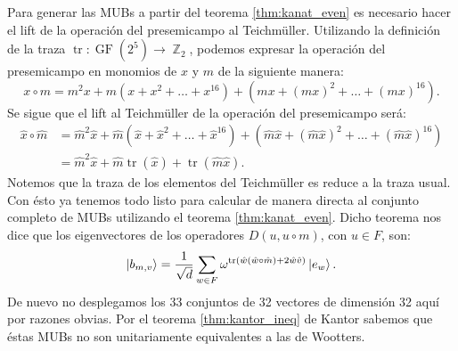 \documentclass[a4paper,11pt]{report}
\DeclareMathOperator{\Z}{\mathbb{Z}}
\DeclareMathOperator{\tr}{tr}
\DeclareMathOperator{\GF}{GF}
\begin{document}
  Para generar las MUBs a partir del teorema
  \ref{thm:kanat_even} es necesario hacer el lift de la
  operación del presemicampo al Teichmüller. Utilizando la
  definición de la traza $\tr : \GF(2^{5}) \to \Z_2$,
  podemos expresar la operación del presemicampo en monomios
  de $x$ y $m$ de la siguiente manera:
  \begin{equation}
    x \circ m
    = m^2 x + m \left( x + x^2 + \ldots + x^{16} \right) +
    \left( mx + (mx)^2 + \ldots + (mx)^{16} \right).
  \end{equation}
  Se sigue que el lift al Teichmüller de la operación del
  presemicampo será: 
  \begin{align}
    \hat x \circ \hat m
    &= \hat m^2 \hat x + \hat m \left( \hat x + \hat x^2 +
    \ldots + \hat x^{16} \right) +
    \left( \hat m \hat x + (\hat m \hat x)^2 + \ldots +
    (\hat m \hat x)^{16} \right) \\
    &= \hat m^2 \hat x + \hat m \tr(\hat x) + \tr(\hat m
    \hat x).
  \end{align}
  Notemos que la traza de los elementos del Teichmüller es
  reduce a la traza usual. Con ésto ya tenemos todo listo
  para calcular de manera directa al conjunto completo de
  MUBs utilizando el teorema \ref{thm:kanat_even}. Dicho
  teorema nos dice que los eigenvectores de los operadores
  $D(u,u \circ m)$, con $u \in F$, son:
  \begin{equation}
    \ket{b_{m,v}}
    = \frac{1}{\sqrt{d}} 
    \sum_{w \in F}^{} \omega^{\tr\left( \hat w (\hat w \circ
    \hat m) + 2 \hat w \hat v\right) } \ket{e_w}.
  \end{equation}
  De nuevo no desplegamos los 33 conjuntos de 32 vectores de
  dimensión 32 aquí por razones obvias. Por el teorema
  \ref{thm:kantor_ineq} de Kantor  sabemos que éstas MUBs no
  son unitariamente equivalentes a las de Wootters.
\end{document}
